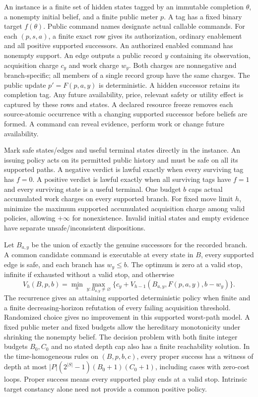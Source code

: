 \begin{theorem}\label{ext:t29j}

An instance is a finite set of hidden states tagged by an immutable completion \(\theta\), a nonempty initial belief, and a finite public meter \(p\). A tag has a fixed binary target \(f(\theta)\). Public command names designate actual callable commands. For each \((p,s,a)\), a finite exact row gives its authorization, ordinary enablement and all positive supported successors. An authorized enabled command has nonempty support. An edge outputs a public record \(y\) containing its observation, acquisition charge \(c_y\) and work charge \(w_y\). Both charges are nonnegative and branch-specific; all members of a single record group have the same charges. The public update \(p'=F(p,a,y)\) is deterministic. A hidden successor retains its completion tag. Any future availability, price, relevant safety or utility effect is captured by these rows and states. A declared resource freeze removes each source-atomic occurrence with a changing supported successor before beliefs are formed. A command can reveal evidence, perform work or change future availability.

Mark safe states/edges and useful terminal states directly in the instance. An issuing policy acts on its permitted public history and must be safe on all its supported paths. A negative verdict is lawful exactly when every surviving tag has \(f=0\). A positive verdict is lawful exactly when all surviving tags have \(f=1\) and every surviving state is a useful terminal. One budget \(b\) caps actual accumulated work charges on every supported branch. For fixed move limit \(h\), minimize the maximum supported accumulated acquisition charge among valid policies, allowing \(+\infty\) for nonexistence. Invalid initial states and empty evidence have separate unsafe/inconsistent dispositions.

Let \(B_{a,y}\) be the union of exactly the genuine successors for the recorded branch. A common candidate command is executable at every state in \(B\), every supported edge is safe, and each branch has \(w_y\le b\). The optimum is zero at a valid stop, infinite if exhausted without a valid stop, and otherwise
\[
  V_h(B,p,b)
  =\min_a\max_{y:B_{a,y}\ne\varnothing}
       \{c_y+V_{h-1}(B_{a,y},F(p,a,y),b-w_y)\}.
\]
The recurrence gives an attaining supported deterministic policy when finite and a finite decreasing-horizon refutation of every failing acquisition threshold. Randomized choice gives no improvement in this supported worst-path model. A fixed public meter and fixed budgets allow the hereditary monotonicity under shrinking the nonempty belief. The decision problem with both finite integer budgets \(B_0,C_0\) and no stated depth cap also has a finite reachability solution. In the time-homogeneous rules on \((B,p,b,c)\), every proper success has a witness of depth at most \(|P|(2^{|S|}-1)(B_0+1)(C_0+1)\), including cases with zero-cost loops. Proper success means every supported play ends at a valid stop. Intrinsic target constancy alone need not provide a common positive policy.


\end{theorem}

